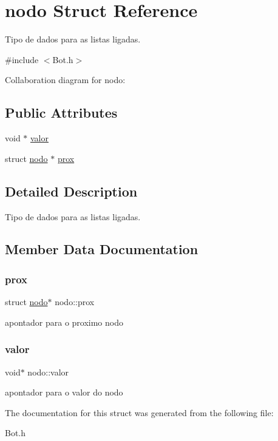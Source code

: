 \hypertarget{structnodo}{}\section{nodo Struct Reference}
\label{structnodo}


Tipo de dados para as listas ligadas.  




{\ttfamily \#include $<$Bot.\+h$>$}



Collaboration diagram for nodo\+:
\subsection*{Public Attributes}
\begin{DoxyCompactItemize}
\item 
void $\ast$ \hyperlink{structnodo_ab63adcdb83ea1fdcf4fa10f3cafc4a6a}{valor}
\item 
struct \hyperlink{structnodo}{nodo} $\ast$ \hyperlink{structnodo_a086547621a7da23b916bbe26e0855308}{prox}
\end{DoxyCompactItemize}


\subsection{Detailed Description}
Tipo de dados para as listas ligadas. 

\subsection{Member Data Documentation}
\mbox{\label{structnodo_a086547621a7da23b916bbe26e0855308}} 
\subsubsection{\texorpdfstring{prox}{prox}}
{\footnotesize\ttfamily struct \hyperlink{structnodo}{nodo}$\ast$ nodo\+::prox}

apontador para o proximo nodo \mbox{\label{structnodo_ab63adcdb83ea1fdcf4fa10f3cafc4a6a}} 
\subsubsection{\texorpdfstring{valor}{valor}}
{\footnotesize\ttfamily void$\ast$ nodo\+::valor}

apontador para o valor do nodo 

The documentation for this struct was generated from the following file\+:\begin{DoxyCompactItemize}
\item 
Bot.\+h\end{DoxyCompactItemize}
